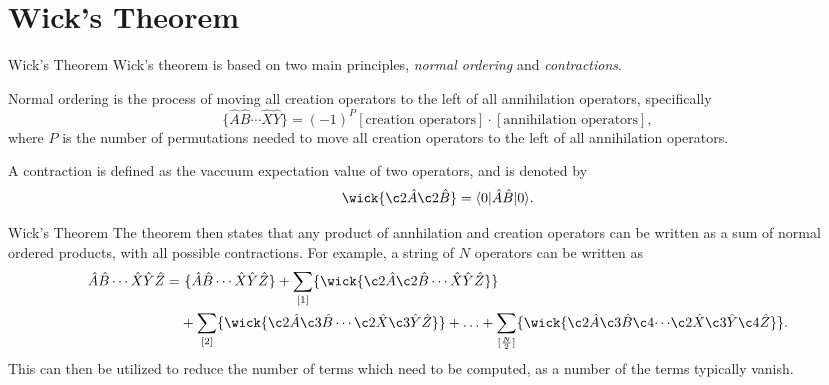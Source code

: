 \documentclass[UKenglish,aspectratio=169]{beamer}
\begin{document}
\section{Wick's Theorem}

\begin{frame}{Wick's Theorem}
    Wick's theorem is based on two main principles, \textit{normal ordering} and \textit{contractions}.

    \medskip

    Normal ordering is the process of moving all creation operators to the left of all annihilation operators, specifically
    \begin{equation}
        \{ \hat{A} \hat{B} \cdots \hat{X} \hat{Y} \} = (-1)^P [ \text{creation operators} ] \cdot [ \text{annihilation operators} ],
    \end{equation}
    where $P$ is the number of permutations needed to move all creation operators to the left of all annihilation operators.

    \medskip

    A contraction is defined as the vaccuum expectation value of two operators, and is denoted by
    \begin{equation}
        \wick{
            \c2 {\hat{A}}
            \c2 {\hat{B}}
        }
        = \langle 0 \vert \hat{A} \hat{B} \vert 0 \rangle.
    \end{equation}
\end{frame}

\begin{frame}{Wick's Theorem}
    The theorem then states that any product of annhilation and creation operators can be written as a sum of normal ordered products, with all possible contractions.
    For example, a string of $N$ operators can be written as
    \begin{equation}
        \begin{split}
            \hat{A} \hat{B} \cdots \hat{X} \hat{Y} \hat{Z}
            =& \ \{ \hat{A} \hat{B} \cdots \hat{X} \hat{Y} \hat{Z} \}
            + \sum_{[1]} \{ \wick{\c2{\hat{A}} \c2{\hat{B}} \cdots \hat{X} \hat{Y} \hat{Z}} \} \\
            &+ \sum_{[2]} \{ \wick{\c2{\hat{A}} \c3{\hat{B}} \cdots \c2{\hat{X}} \c3{\hat{Y}} \hat{Z}} \}
            + \ldots
            + \sum_{[\frac{N}{2}]} \{ \wick{\c2{\hat{A}} \c3{\hat{B}} \c4{\cdots} \c2{\hat{X}} \c3{\hat{Y}} \c4{\hat{Z}}} \}.
        \end{split}
    \end{equation}
    This can then be utilized to reduce the number of terms which need to be computed, as a number of the terms typically vanish.
\end{frame}
\end{document}
